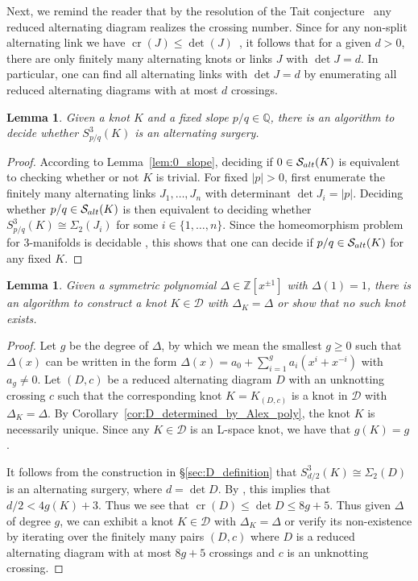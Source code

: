 \documentclass{amsart} %
\newcommand{\D}{\mathcal{D}}
\newcommand{\Z}{\mathbb{Z}}
\newcommand{\Q}{\mathbb{Q}}
\newcommand{\Salt}{\mathcal{S}_{\rm alt}}
\theoremstyle{thm}
\newtheorem{lem}[Theorem]{Lemma}
\theoremstyle{definition}
\numberwithin{equation}{section}
\begin{document}
Next, we remind the reader that by the resolution of the Tait conjecture~\cite{Taite1,Taite2,Taite3} any reduced alternating diagram realizes the crossing number. 
Since for any non-split alternating link we have $\operatorname{cr}(J)\leq \det (J)$~\cite{det_alt}, it follows that for a given $d>0$, there are only finitely many alternating knots or links $J$ with $\det J=d$. In particular, one can find all alternating links with $\det J=d$ by enumerating all reduced alternating diagrams with at most $d$ crossings.

\begin{lem}\label{lem:pq_in_salt}
Given a knot $K$ and a fixed slope $p/q\in \Q$, there is an algorithm to decide whether $S_{p/q}^3(K)$ is an alternating surgery.  
\end{lem}
\begin{proof}
According to Lemma~\ref{lem:0_slope}, deciding if $0\in \Salt(K)$ is equivalent to checking whether or not $K$ is trivial.
For fixed $|p|>0$, first enumerate the finitely many alternating links $J_1, \dots, J_n$ with determinant $\det J_i=|p|$. Deciding whether $p/q\in \Salt(K)$ is then equivalent to deciding whether $S_{p/q}^3(K)\cong \Sigma_2(J_i)$ for some $i\in \{1,\dots, n\}$. Since the homeomorphism problem for 3-manifolds is decidable \cite{Kuperberg2019homeomorphism}, this shows that one can decide if $p/q\in \Salt(K)$ for any fixed $K$. 
\end{proof}

\begin{lem}\label{lem:exists_knot_in_D}
Given a symmetric polynomial $\Delta\in \Z[x^{\pm 1}]$ with $\Delta(1)=1$, there is an algorithm to construct a knot $K\in \D$ with $\Delta_K=\Delta$ or show that no such knot exists.
\end{lem}
\begin{proof} 
Let $g$ be the degree of $\Delta$, by which we mean the smallest $g\geq 0$ such that $\Delta(x)$ can be written in the form $\Delta(x)=a_0+\sum_{i=1}^g a_i (x^{i}+x^{-i})$ with $a_g\neq 0$. Let $(D,c)$ be a reduced alternating diagram $D$ with an unknotting crossing $c$ such that the corresponding knot $K=K_{(D,c)}$ is a knot in $\D$ with $\Delta_K=\Delta$. By Corollary~\ref{cor:D_determined_by_Alex_poly}, the knot $K$ is necessarily unique. Since any $K\in \D$ is an L-space knot, we have that $g(K)=g$.
 
It follows from the construction in \S\ref{sec:D_definition} that $S_{d/2}^3(K)\cong \Sigma_2(D)$ is an alternating surgery, where $d=\det D$. By \cite[Theorem~1.1]{Mc17}, this implies that $d/2 < 4g(K)+3$. Thus we see that $\operatorname{cr}(D)\leq \det D\leq 8g+5$. Thus given $\Delta$ of degree $g$, we can exhibit a knot $K\in \D$ with $\Delta_K=\Delta$ or verify its non-existence by iterating over the finitely many pairs $(D,c)$ where $D$ is a reduced alternating diagram with at most $8g+5$ crossings and $c$ is an unknotting crossing.
\end{proof}
\end{document}
